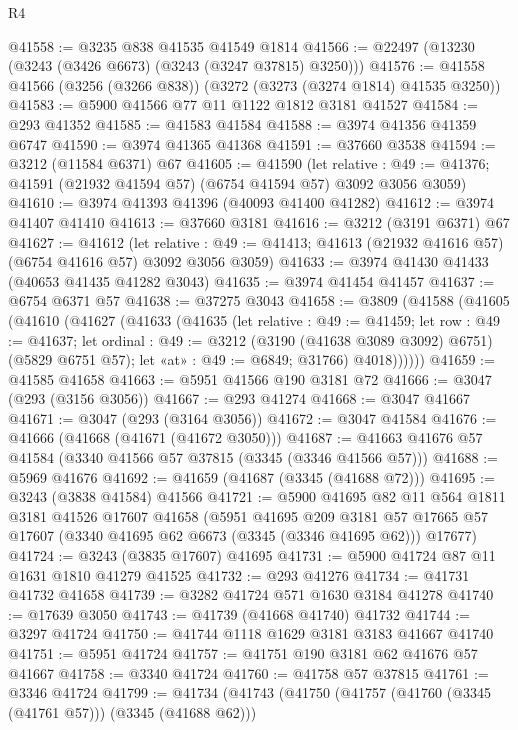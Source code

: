 \begin{lexlean}{R4}
\begin{coremodule}
@41558 := @3235 @838 @41535 @41549 @1814
@41566 := @22497 (@13230 (@3243 (@3426 @6673) (@3243 (@3247 @37815) @3250)))
@41576 := @41558 @41566 (@3256 (@3266 @838)) (@3272 (@3273 (@3274 @1814) @41535 @3250))
@41583 := @5900 @41566 @77 @11 @1122 @1812 @3181 @41527
@41584 := @293 @41352
@41585 := @41583 @41584
@41588 := @3974 @41356 @41359 @6747
@41590 := @3974 @41365 @41368
@41591 := @37660 @3538
@41594 := @3212 (@11584 @6371) @67
@41605 := @41590
    (let relative : @49 := @41376; @41591 (@21932 @41594 @57) (@6754 @41594 @57) @3092 @3056 @3059)
@41610 := @3974 @41393 @41396 (@40093 @41400 @41282)
@41612 := @3974 @41407 @41410
@41613 := @37660 @3181
@41616 := @3212 (@3191 @6371) @67
@41627 := @41612
    (let relative : @49 := @41413; @41613 (@21932 @41616 @57) (@6754 @41616 @57) @3092 @3056 @3059)
@41633 := @3974 @41430 @41433 (@40653 @41435 @41282 @3043)
@41635 := @3974 @41454 @41457
@41637 := @6754 @6371 @57
@41638 := @37275 @3043
@41658 := @3809
    (@41588
      (@41605
        (@41610
          (@41627
            (@41633
              (@41635
                (let relative : @49 := @41459;
                let row : @49 := @41637;
                let ordinal : @49 := @3212 (@3190 (@41638 @3089 @3092) @6751) (@5829 @6751 @57);
                let «at» : @49 := @6849; @31766)
                @4018))))))
@41659 := @41585 @41658
@41663 := @5951 @41566 @190 @3181 @72
@41666 := @3047 (@293 (@3156 @3056))
@41667 := @293 @41274
@41668 := @3047 @41667
@41671 := @3047 (@293 (@3164 @3056))
@41672 := @3047 @41584
@41676 := @41666 (@41668 (@41671 (@41672 @3050)))
@41687 := @41663 @41676 @57 @41584 (@3340 @41566 @57 @37815 (@3345 (@3346 @41566 @57)))
@41688 := @5969 @41676
@41692 := @41659 (@41687 (@3345 (@41688 @72)))
@41695 := @3243 (@3838 @41584) @41566
@41721 := @5900
    @41695
    @82
    @11
    @564
    @1811
    @3181
    @41526
    @17607
    @41658
    (@5951
      @41695
      @209
      @3181
      @57
      @17665
      @57
      @17607
      (@3340 @41695 @62 @6673 (@3345 (@3346 @41695 @62)))
      @17677)
@41724 := @3243 (@3835 @17607) @41695
@41731 := @5900 @41724 @87 @11 @1631 @1810 @41279 @41525
@41732 := @293 @41276
@41734 := @41731 @41732 @41658
@41739 := @3282 @41724 @571 @1630 @3184 @41278
@41740 := @17639 @3050
@41743 := @41739 (@41668 @41740) @41732
@41744 := @3297 @41724
@41750 := @41744 @1118 @1629 @3181 @3183 @41667 @41740
@41751 := @5951 @41724
@41757 := @41751 @190 @3181 @62 @41676 @57 @41667
@41758 := @3340 @41724
@41760 := @41758 @57 @37815
@41761 := @3346 @41724
@41799 := @41734
    (@41743
      (@41750
        (@41757 (@41760 (@3345 (@41761 @57))) (@3345 (@41688 @62)))

\end{coremodule}
\end{lexlean}
